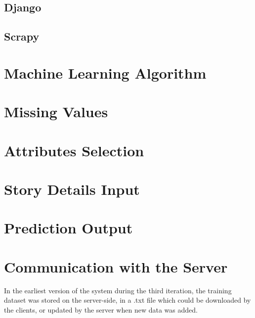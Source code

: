 \documentclass{mproj}
\begin{document}
\subsection{Django}

\subsection{Scrapy}\label{scrapy}

\section{Machine Learning Algorithm}

\section{Missing Values}\label{missing_values}

\section{Attributes Selection}

\section{Story Details Input}

\section{Prediction Output}

\section{Communication with the Server}

In the earliest version of the system during the third iteration, the training dataset was stored on the server-side, in a .txt file which could be downloaded by the clients, or updated by the server when new data was added. \par
\end{document}

